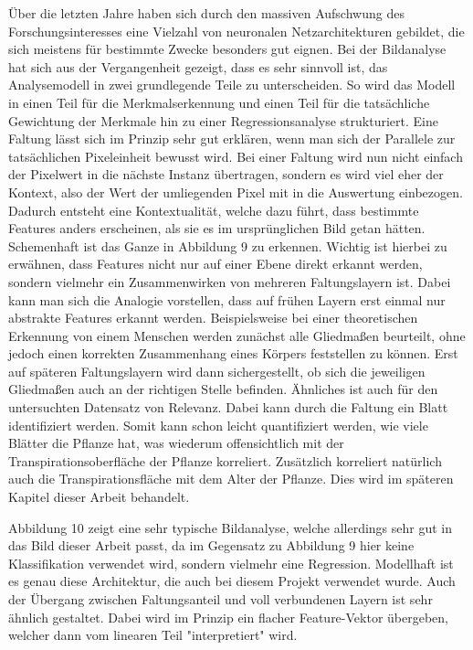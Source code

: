 Über die letzten Jahre haben sich durch den massiven Aufschwung des Forschungsinteresses eine Vielzahl von neuronalen Netzarchitekturen gebildet, die sich meistens für bestimmte Zwecke besonders gut eignen. Bei der Bildanalyse hat sich aus der Vergangenheit gezeigt, dass es sehr sinnvoll ist, das Analysemodell in zwei grundlegende Teile zu unterscheiden. So wird das Modell in einen Teil für die Merkmalserkennung und einen Teil für die tatsächliche Gewichtung der Merkmale hin zu einer Regressionsanalyse strukturiert. Eine Faltung lässt sich im Prinzip sehr gut erklären, wenn man sich der Parallele zur tatsächlichen Pixeleinheit bewusst wird. Bei einer Faltung wird nun nicht einfach der Pixelwert in die nächste Instanz übertragen, sondern es wird viel eher der Kontext, also der Wert der umliegenden Pixel mit in die Auswertung einbezogen. Dadurch entsteht eine Kontextualität, welche dazu führt, dass bestimmte Features anders erscheinen, als sie es im ursprünglichen Bild getan hätten. Schemenhaft ist das Ganze in Abbildung 9 zu erkennen. Wichtig ist hierbei zu erwähnen, dass Features nicht nur auf einer Ebene direkt erkannt werden, sondern vielmehr ein Zusammenwirken von mehreren Faltungslayern ist. \cite{ZOU2024107839} Dabei kann man sich die Analogie vorstellen, dass auf frühen Layern erst einmal nur abstrakte Features erkannt werden. Beispielsweise bei einer theoretischen Erkennung von einem Menschen werden zunächst alle Gliedmaßen beurteilt, ohne jedoch einen korrekten Zusammenhang eines Körpers feststellen zu können. Erst auf späteren Faltungslayern wird dann sichergestellt, ob sich die jeweiligen Gliedmaßen auch an der richtigen Stelle befinden. Ähnliches ist auch für den untersuchten Datensatz von Relevanz. Dabei kann durch die Faltung ein Blatt identifiziert werden. Somit kann schon leicht quantifiziert werden, wie viele Blätter die Pflanze hat, was wiederum offensichtlich mit der Transpirationsoberfläche der Pflanze korreliert. Zusätzlich korreliert natürlich auch die Transpirationsfläche mit dem Alter der Pflanze. Dies wird im späteren Kapitel dieser Arbeit behandelt. \newline \par
Abbildung 10 zeigt eine sehr typische Bildanalyse, welche allerdings sehr gut in das Bild dieser Arbeit passt, da im Gegensatz zu Abbildung 9 hier keine Klassifikation verwendet wird, sondern vielmehr eine Regression. Modellhaft ist es genau diese Architektur, die auch bei diesem Projekt verwendet wurde. Auch der Übergang zwischen Faltungsanteil und voll verbundenen Layern ist sehr ähnlich gestaltet. Dabei wird im Prinzip ein flacher Feature-Vektor übergeben, welcher dann vom linearen Teil "interpretiert" wird.
